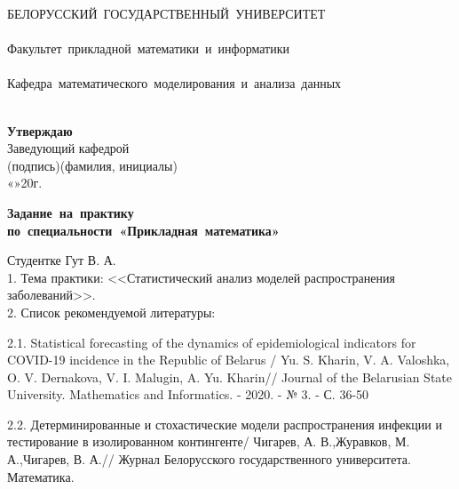 \documentclass[a4paper, 14pt]{extreport}
\begin{document}
	\begin{center}
		{
			\mbox{БЕЛОРУССКИЙ~ГОСУДАРСТВЕННЫЙ~УНИВЕРСИТЕТ} \\~\\
			\mbox{Факультет~прикладной математики~и~информатики} \\~\\
			\mbox{Кафедра~математического~моделирования~и~анализа~данных} \\~\\[2mm]
		}
		\vspace{0.5cm}
		\hfill
		\begin{minipage}{.6\textwidth}
			\begin{flushright}
				\textbf{Утверждаю}\hspace*{4.2cm} \\
				Заведующий кафедрой \underline{\hspace*{4cm}}\\[-2mm]
				{\scriptsize(подпись)(фамилия, инициалы)}\\[2ex]
				«\underline{\hspace*{0.5cm}}»\underline{\hspace*{2cm}}20\underline{\hspace*{0.5cm}}г.
				
			\end{flushright}
		\end{minipage}
		
		\vspace{1cm}
		\bf
		{
			\mbox{Задание на практику}\\
			\mbox{по специальности «Прикладная математика»} \\[6mm]
		}
	\end{center}
	Студентке Гут В. А.\\[2mm]
	1. Тема практики:
	<<Статистический анализ моделей распространения заболеваний>>.\\[6mm]
	2. Список рекомендуемой литературы:
	
	2.1. Statistical forecasting of the dynamics of epidemiological indicators for COVID-19 incidence in the Republic of Belarus / Yu. S. Kharin, V. A. Valoshka, O. V. Dernakova, V. I. Malugin, A. Yu. Kharin// Journal of the Belarusian State University. Mathematics and Informatics. - 2020. - № 3. - С. 36-50
	
	2.2. Детерминированные и стохастические модели распространения инфекции и тестирование в изолированном контингенте/ Чигарев, А. В.,Журавков, М. А.,Чигарев, В. А.// Журнал Белорусского государственного университета. Математика.
	
\end{document}
